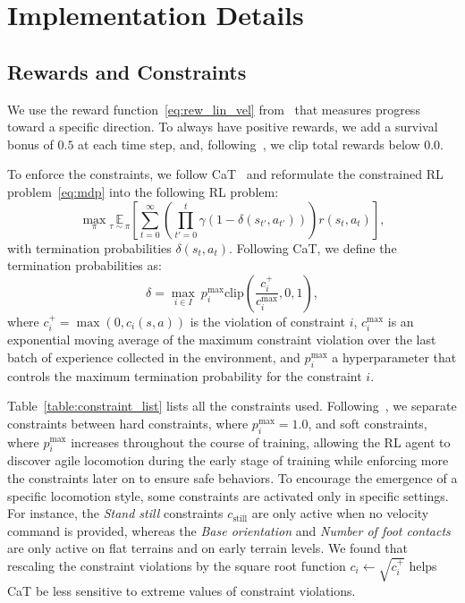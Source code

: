 \appendix

\section{Implementation Details}\label{appendix:implementation_details}


\subsection{Rewards and Constraints}

We use the reward function~\ref{eq:rew_lin_vel} from~\citep{cheng2023parkour} that measures progress toward a specific direction.
To always have positive rewards, we add a survival bonus of $0.5$ at each time step, and, following~\citep{rudin2022learning}, we clip total rewards below $0.0$.

To enforce the constraints, we follow CaT~\citep{chane2024cat} and reformulate the constrained RL problem~\ref{eq:mdp} into the following RL problem:
\begin{equation}
\max_\pi \underset{\tau \sim \pi}{\mathbb{E}} \! \left [ \sum_{t=0}^\infty \! \left ( \prod_{t'=0}^t \gamma (1 - \delta (s_{t'}, a_{t'})) \! \right ) \! r(s_t, a_t) \right ], 
\label{eq:cat_mdp}
\end{equation}
with termination probabilities $\delta(s_t, a_t)$.
Following CaT, we define the termination probabilities as:
\begin{equation}
\label{eq:delta_function}
\delta = \max_{i \in I} \: p_i^\text{max} \text{clip}(\frac{c_i^+}{c_i^\text{max}}, 0, 1),
\end{equation}
where $c_i^+ = \max(0, c_i(s, a))$ is the violation of constraint $i$, $c_i^\text{max}$ is an exponential moving average of the maximum constraint violation over the last batch of experience collected in the environment, and $p_i^\text{max}$ a hyperparameter that controls the maximum termination probability for the constraint $i$.

Table~\ref{table:constraint_list} lists all the constraints used.
Following~\citep{chane2024cat}, we separate constraints between hard constraints, where $p_i^\text{max}=1.0$, and soft constraints, where $p_i^\text{max}$ increases throughout the course of training, allowing the RL agent to discover agile locomotion during the early stage of training while enforcing more the constraints later on to ensure safe behaviors.
To encourage the emergence of a specific locomotion style, some constraints are activated only in specific settings.
For instance, the \textit{Stand still} constraints $c_\text{still}$ are only active when no velocity command is provided, whereas the \textit{Base orientation} and \textit{Number of foot contacts} are only active on flat terrains and on early terrain levels. 
We found that rescaling the constraint violations by the square root function $c_i \leftarrow \sqrt{c_i^+}$ helps CaT be less sensitive to extreme values of constraint violations.


